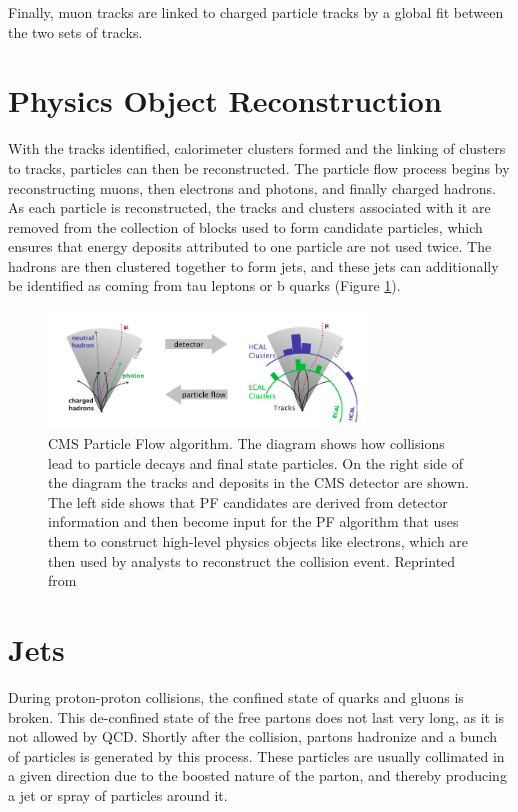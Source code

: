  Finally, muon tracks are linked to charged particle tracks by a global fit between the two sets of tracks.

 \section{Physics Object Reconstruction}

With the tracks identified, calorimeter clusters formed and the linking of clusters to tracks, particles can then be reconstructed. The particle flow process begins by reconstructing muons, then electrons and photons, and finally charged hadrons. As each particle is reconstructed, the tracks and clusters associated with it are removed from the collection of blocks used to form candidate particles, which ensures that energy deposits attributed to one particle are not used twice. The hadrons are then clustered together to form jets, and these jets can additionally be identified as coming from tau leptons or b quarks (Figure \ref{fig:pf}).


 \begin{figure}[h]
  	\label{fig:pf}
 	\centering
 	\includegraphics[width=0.75\textwidth]{figures/jets.png}
 	\singlespace
 	\caption{CMS Particle Flow algorithm. The diagram shows how collisions lead to particle decays and final state particles. On the right side of the diagram the tracks and deposits in the CMS detector are shown. The left side shows that PF candidates are derived from detector information and then become input for the PF algorithm that uses them to construct high-level physics objects like electrons, which are then used by analysts to reconstruct the collision event. Reprinted from \cite{CMS-PAS-PFT-09-001}}
 \end{figure}

\section{Jets}

During proton-proton collisions, the confined state of quarks and gluons is broken. This de-confined state of the free partons does not last very long, as it is not allowed by QCD. Shortly after the collision, partons hadronize and a bunch of particles is generated by this process. These particles are usually collimated in a given direction due to the boosted nature of the parton, and thereby producing a jet or spray of particles around it.


